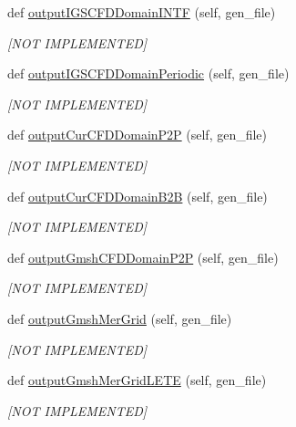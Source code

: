 \begin{DoxyCompactItemize}
def \hyperlink{a00070_aa16a1dab2d93130c1cc0b4c24ec2caef}{output\+I\+G\+S\+C\+F\+D\+Domain\+I\+N\+TF} (self, gen\+\_\+file)
\begin{DoxyCompactList}\small\item\em \mbox{[}N\+OT I\+M\+P\+L\+E\+M\+E\+N\+T\+ED\mbox{]} \end{DoxyCompactList}\item 
def \hyperlink{a00070_a3093ea91273711f4b82aa878c0204407}{output\+I\+G\+S\+C\+F\+D\+Domain\+Periodic} (self, gen\+\_\+file)
\begin{DoxyCompactList}\small\item\em \mbox{[}N\+OT I\+M\+P\+L\+E\+M\+E\+N\+T\+ED\mbox{]} \end{DoxyCompactList}\item 
def \hyperlink{a00070_a3b5fc7f417d1912f563df69560f57c2e}{output\+Cur\+C\+F\+D\+Domain\+P2P} (self, gen\+\_\+file)
\begin{DoxyCompactList}\small\item\em \mbox{[}N\+OT I\+M\+P\+L\+E\+M\+E\+N\+T\+ED\mbox{]} \end{DoxyCompactList}\item 
def \hyperlink{a00070_a925f588daf72fce3ec4e0b89839c290d}{output\+Cur\+C\+F\+D\+Domain\+B2B} (self, gen\+\_\+file)
\begin{DoxyCompactList}\small\item\em \mbox{[}N\+OT I\+M\+P\+L\+E\+M\+E\+N\+T\+ED\mbox{]} \end{DoxyCompactList}\item 
def \hyperlink{a00070_a998cb328088bc95e267cffed35c231ce}{output\+Gmsh\+C\+F\+D\+Domain\+P2P} (self, gen\+\_\+file)
\begin{DoxyCompactList}\small\item\em \mbox{[}N\+OT I\+M\+P\+L\+E\+M\+E\+N\+T\+ED\mbox{]} \end{DoxyCompactList}\item 
def \hyperlink{a00070_a0044216044b48baae08e478a2f358c39}{output\+Gmsh\+Mer\+Grid} (self, gen\+\_\+file)
\begin{DoxyCompactList}\small\item\em \mbox{[}N\+OT I\+M\+P\+L\+E\+M\+E\+N\+T\+ED\mbox{]} \end{DoxyCompactList}\item 
def \hyperlink{a00070_a36211b3ff2243e25921e48d71b9dcf7c}{output\+Gmsh\+Mer\+Grid\+L\+E\+TE} (self, gen\+\_\+file)
\begin{DoxyCompactList}\small\item\em \mbox{[}N\+OT I\+M\+P\+L\+E\+M\+E\+N\+T\+ED\mbox{]} \end{DoxyCompactList}\item 

\end{DoxyCompactItemize}
